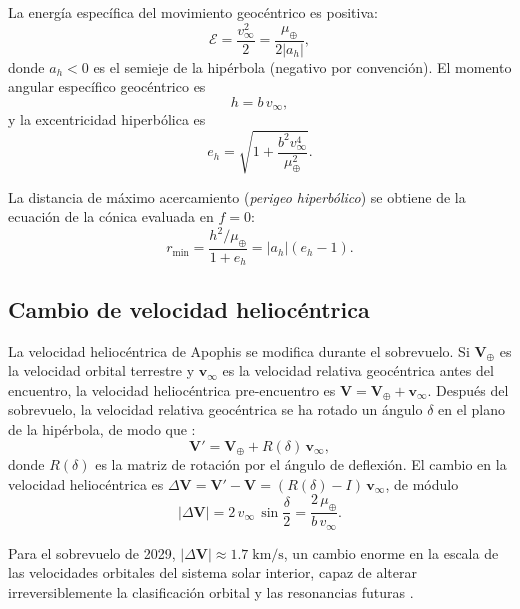 \documentclass[a4paper]{article}
\begin{document}
La energía específica del movimiento geocéntrico es positiva:
\begin{equation}
  \mathcal{E} = \frac{v_\infty^2}{2} = \frac{\mu_\oplus}{2|a_h|},
\end{equation}
donde $a_h < 0$ es el semieje de la hipérbola (negativo por convención). El momento angular específico geocéntrico es
\begin{equation}
  h = b\,v_\infty,
\end{equation}
y la excentricidad hiperbólica es
\begin{equation}
  e_h = \sqrt{1 + \frac{b^2 v_\infty^4}{\mu_\oplus^2}}.
\end{equation}

La distancia de máximo acercamiento (\textit{perigeo hiperbólico}) se obtiene de la ecuación de la cónica evaluada en $f = 0$:
\begin{equation}
  r_\text{min} = \frac{h^2/\mu_\oplus}{1 + e_h} = |a_h|(e_h - 1).
\end{equation}

\subsection{Cambio de velocidad heliocéntrica}

La velocidad heliocéntrica de Apophis se modifica durante el sobrevuelo. Si $\mathbf{V}_\oplus$ es la velocidad orbital terrestre y $\mathbf{v}_\infty$ es la velocidad relativa geocéntrica antes del encuentro, la velocidad heliocéntrica pre-encuentro es $\mathbf{V} = \mathbf{V}_\oplus + \mathbf{v}_\infty$. Después del sobrevuelo, la velocidad relativa geocéntrica se ha rotado un ángulo $\delta$ en el plano de la hipérbola, de modo que \cite{murray1999solar}:
\begin{equation}
  \mathbf{V}' = \mathbf{V}_\oplus + R(\delta)\,\mathbf{v}_\infty,
\end{equation}
donde $R(\delta)$ es la matriz de rotación por el ángulo de deflexión. El cambio en la velocidad heliocéntrica es $\Delta \mathbf{V} = \mathbf{V}' - \mathbf{V} = (R(\delta) - I)\,\mathbf{v}_\infty$, de módulo
\begin{equation}
  |\Delta \mathbf{V}| = 2\,v_\infty\,\sin\frac{\delta}{2} = \frac{2\,\mu_\oplus}{b\,v_\infty}.
\end{equation}

Para el sobrevuelo de 2029, $|\Delta \mathbf{V}| \approx 1.7\;\text{km/s}$, un cambio enorme en la escala de las velocidades orbitales del sistema solar interior, capaz de alterar irreversiblemente la clasificación orbital y las resonancias futuras \cite{scheeres2023proximity, esa2024apophis}.
\end{document}
